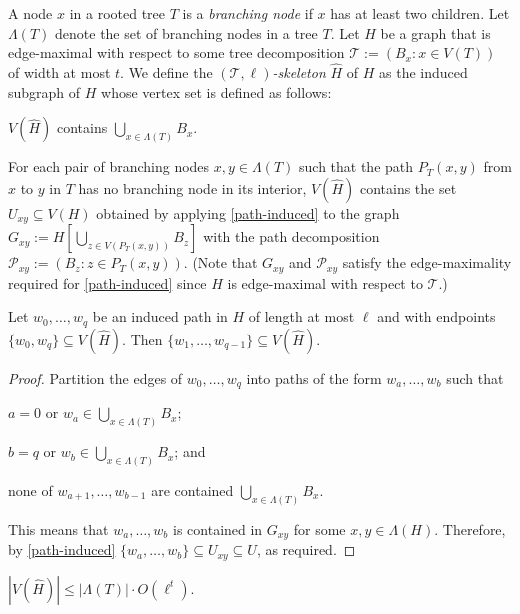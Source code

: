 \documentclass[kpfonts]{patmorin}
\theoremstyle{named}
\begin{document}
A node $x$ in a rooted tree $T$ is a \emph{branching node} if $x$ has at least two children.  Let $\Lambda(T)$ denote the set of branching nodes in a tree $T$.  Let $H$ be a graph that is edge-maximal with respect to some tree decomposition $\mathcal{T}:=(B_x:x\in V(T))$ of width at most $t$. We define the \emph{$(\mathcal{T},\ell)$-skeleton} $\hat{H}$ of $H$ as the induced subgraph of $H$ whose vertex set is defined as follows:
\begin{compactenum}
    \item $V(\hat{H})$ contains $\bigcup_{x\in\Lambda(T)} B_x$.

    \item For each pair of branching nodes $x,y\in\Lambda(T)$ such that the path $P_T(x,y)$ from $x$ to $y$ in $T$ has no branching node in its interior, $V(\hat{H})$ contains the set $U_{xy}\subseteq V(H)$ obtained by applying \cref{path-induced} to the graph $G_{xy}:=H[\bigcup_{z\in V(P_T(x,y))} B_z]$ with the path decomposition $\mathcal{P}_{xy}:=(B_z:z\in P_T(x,y))$.  (Note that $G_{xy}$ and $\mathcal{P}_{xy}$ satisfy the edge-maximality required for \cref{path-induced} since $H$ is edge-maximal with respect to $\mathcal{T}$.)
\end{compactenum}


\begin{lem}\label{skeleton-paths}
    Let $w_0,\ldots,w_q$ be an induced path in $H$ of length at most $\ell$ and with endpoints $\{w_0,w_q\}\subseteq V(\hat{H})$. Then $\{w_1,\ldots,w_{q-1}\}\subseteq V(\hat{H})$.
\end{lem}

\begin{proof}
    Partition the edges of $w_0,\ldots,w_q$ into paths of the form $w_a,\ldots,w_b$ such that
    \begin{inparaenum}[(i)]
        \item $a=0$ or $w_a\in\bigcup_{x\in \Lambda(T)} B_x$;
        \item $b=q$ or $w_b\in\bigcup_{x\in \Lambda(T)} B_x$; and
        \item none of $w_{a+1},\ldots,w_{b-1}$ are contained $\bigcup_{x\in \Lambda(T)} B_x$.
    \end{inparaenum}
    This means that $w_a,\ldots,w_b$ is contained in $G_{xy}$ for some $x,y\in \Lambda(H)$.  Therefore, by \cref{path-induced} $\{w_a,\ldots,w_b\}\subseteq U_{xy}\subseteq U$, as required.
\end{proof}


\begin{lem}\label{skeleton-size}
    $|V(\hat{H})|\le |\Lambda(T)|\cdot O(\ell^t)$.
\end{lem}
\end{document}
